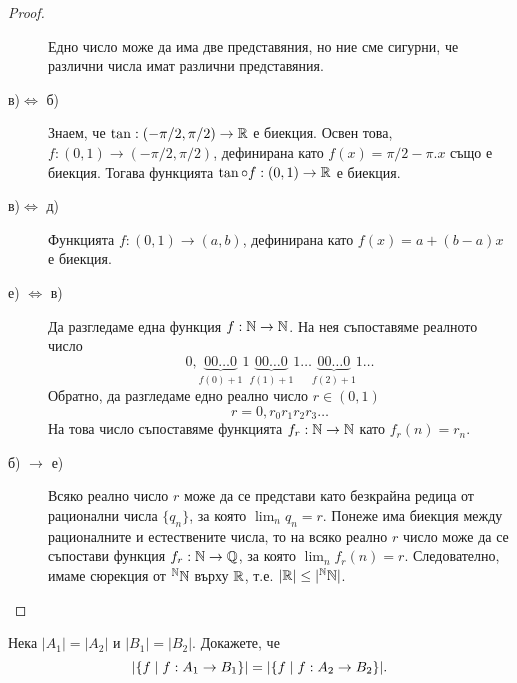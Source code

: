 \begin{proof}
\begin{description}
    Едно число може да има две представяния, но ние сме сигурни, че различни числа имат различни представяния.
  \item[в)$\iff$ б)]
    Знаем, че $\tan: (-\pi/2,\pi/2) \to \mathbb{R}$ е биекция.
    Освен това, $f: (0,1) \to (-\pi/2,\pi/2)$, дефинирана като
    $f(x) = \pi/2 - \pi.x$ също е биекция.
    Тогава функцията $\tan\circ f : (0,1) \to \mathbb{R}$ е биекция.
  \item[в)$\iff$ д)]
    Функцията $f: (0,1) \to (a,b)$,
    дефинирана като $f(x) = a + (b-a)x$ е биекция.
  \item[е) $\iff$ в)]
    Да разгледаме една функция $f:\mathbb{N}\to\mathbb{N}$.
    На нея съпоставяме реалното число
    \[0,\underbrace{00\dots 0}_{f(0)+1}1\underbrace{00\dots 0}_{f(1)+1}1\dots\underbrace{00\dots 0}_{f(2)+1}1\dots\]
    Обратно, да разгледаме едно реално число $r\in (0,1)$
    \[r = 0, r_0r_1r_2r_3\dots\]
    На това число съпоставяме функцията $f_r:\mathbb{N}\to\mathbb{N}$ като $f_r(n) = r_n$.
  \item[б) $\rightarrow$ е)]
    Всяко реално число $r$ може да се представи като безкрайна редица от рационални числа $\{q_n\}$,
    за която $\lim_n q_n = r$.
    Понеже има биекция между рационалните и естествените числа, то на всяко реално $r$ число може да се съпостави
    функция $f_r:\mathbb{N}\to \mathbb{Q}$, за която $\lim_n f_r(n) = r$.
    Следователно, имаме сюрекция от $^{\mathbb{N}}\mathbb{N}$ върху $\mathbb{R}$, т.е. $\lvert{\mathbb{R}}\rvert \leq \lvert{^{\mathbb{N}}\mathbb{N}}\rvert$.
  \end{description}
\end{proof}

\begin{problem}
  Нека $|A_1| = |A_2|$ и $|B_1| = |B_2|$.
  Докажете, че \[\lvert{\{f\mid f:A_1\to B_1\}}\rvert = \lvert{\{f\mid f:A_2\to B_2\}}\rvert.\]
\end{problem}


